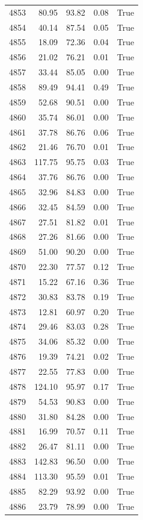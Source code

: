 \begin{longtable}{rrrrr}
4853 & 80.95 & 93.82 & 0.08 & True \\
4854 & 40.14 & 87.54 & 0.05 & True \\
4855 & 18.09 & 72.36 & 0.04 & True \\
4856 & 21.02 & 76.21 & 0.01 & True \\
4857 & 33.44 & 85.05 & 0.00 & True \\
4858 & 89.49 & 94.41 & 0.49 & True \\
4859 & 52.68 & 90.51 & 0.00 & True \\
4860 & 35.74 & 86.01 & 0.00 & True \\
4861 & 37.78 & 86.76 & 0.06 & True \\
4862 & 21.46 & 76.70 & 0.01 & True \\
4863 & 117.75 & 95.75 & 0.03 & True \\
4864 & 37.76 & 86.76 & 0.00 & True \\
4865 & 32.96 & 84.83 & 0.00 & True \\
4866 & 32.45 & 84.59 & 0.00 & True \\
4867 & 27.51 & 81.82 & 0.01 & True \\
4868 & 27.26 & 81.66 & 0.00 & True \\
4869 & 51.00 & 90.20 & 0.00 & True \\
4870 & 22.30 & 77.57 & 0.12 & True \\
4871 & 15.22 & 67.16 & 0.36 & True \\
4872 & 30.83 & 83.78 & 0.19 & True \\
4873 & 12.81 & 60.97 & 0.20 & True \\
4874 & 29.46 & 83.03 & 0.28 & True \\
4875 & 34.06 & 85.32 & 0.00 & True \\
4876 & 19.39 & 74.21 & 0.02 & True \\
4877 & 22.55 & 77.83 & 0.00 & True \\
4878 & 124.10 & 95.97 & 0.17 & True \\
4879 & 54.53 & 90.83 & 0.00 & True \\
4880 & 31.80 & 84.28 & 0.00 & True \\
4881 & 16.99 & 70.57 & 0.11 & True \\
4882 & 26.47 & 81.11 & 0.00 & True \\
4883 & 142.83 & 96.50 & 0.00 & True \\
4884 & 113.30 & 95.59 & 0.01 & True \\
4885 & 82.29 & 93.92 & 0.00 & True \\
4886 & 23.79 & 78.99 & 0.00 & True \\

\end{longtable}
